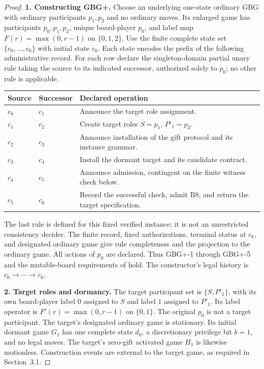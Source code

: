 \documentclass[11pt,letterpaper]{article}
\theoremstyle{definition}\newtheorem{definition}[theorem]{Definition}\newtheorem{example}[theorem]{Example}
\theoremstyle{remark}\newtheorem{remark}[theorem]{Remark}
\begin{document}
\begin{proof}
\textbf{1. Constructing GBG+.} Choose an underlying one-state ordinary GBG with ordinary participants $p_1,p_2$ and no ordinary moves. Its enlarged game has participants $p_0,p_1,p_2$, unique board-player $p_0$, and label map $F(r)=\max(0,r-1)$ on $\{0,1,2\}$. Use the finite complete state set $\{c_0,\dots,c_6\}$ with initial state $c_0$. Each state encodes the prefix of the following administrative record. For each row declare the singleton-domain partial unary rule taking the source to its indicated successor, authorized solely to $p_0$; no other rule is applicable.
\begin{center}\small
\begin{tabularx}{0.94\textwidth}{@{}llX@{}}
\toprule
Source & Successor & Declared operation \\
\midrule
$c_0$ & $c_1$ & Announce the target role assignment. \\
$c_1$ & $c_2$ & Create target roles $S=p_1$, $P'_1=p_2$. \\
$c_2$ & $c_3$ & Announce installation of the gift protocol and its instance grammar. \\
$c_3$ & $c_4$ & Install the dormant target and its candidate contract. \\
$c_4$ & $c_5$ & Announce admission, contingent on the finite witness check below. \\
$c_5$ & $c_6$ & Record the successful check, admit B8, and return the target specification. \\
\bottomrule
\end{tabularx}
\end{center}
The last rule is defined for this fixed verified instance; it is not an unrestricted consistency decider. The finite record, fixed authorizations, terminal status at $c_6$, and designated ordinary game give rule completeness and the projection to the ordinary game. All actions of $p_0$ are declared. Thus GBG+-1 through GBG+-5 and the mutable-board requirements of \cite[\S24]{gbg} hold. The constructor's legal history is $c_0\to\cdots\to c_6$.

\textbf{2. Target roles and dormancy.} The target participant set is $\{S,P'_1\}$, with its own board-player label $0$ assigned to $S$ and label $1$ assigned to $P'_1$. Its label operator is $F'(r)=\max(0,r-1)$ on $\{0,1\}$. The original $p_0$ is not a target participant. The target's designated ordinary game is stationary. Its initial dormant game $G_1$ has one complete state $d_0$, a discretionary privilege bit $b=1$, and no legal moves. The target's zero-gift activated game $H_1$ is likewise motionless. Construction events are external to the target game, as required in Section~3.1.


\end{proof}
\end{document}

